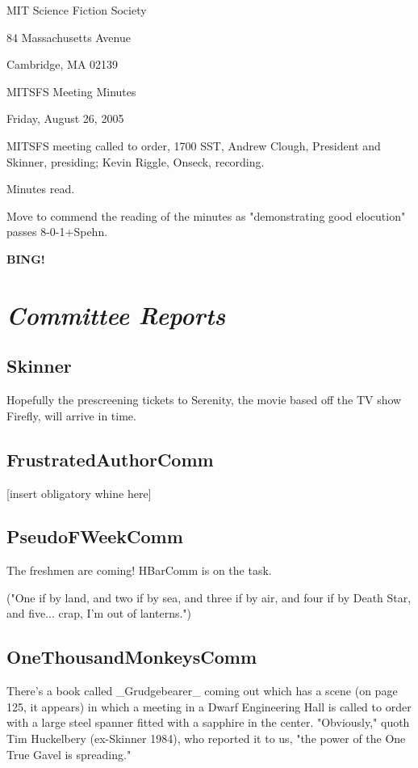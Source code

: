 \documentclass[10pt]{article}
\newcommand{\bing}{{\bf BING!} }
\newcommand{\goto}[1]{\bing \vskip 12pt \section*{{\em{#1}}}}
\begin{document}
\begin{center}

MIT Science Fiction Society

84 Massachusetts Avenue

Cambridge, MA 02139

\vspace{12pt}

MITSFS Meeting Minutes

Friday, August 26, 2005

\end{center}

\vspace{18pt}

\setlength{\parskip}{6pt}

\noindent
MITSFS meeting called to order, 1700 SST, Andrew Clough, President and 
Skinner, presiding; Kevin Riggle,  Onseck, recording.

Minutes read.

Move to commend the reading of the minutes as "demonstrating good elocution" passes 8-0-1+Spehn.

\goto{Committee Reports}
\subsection*{Skinner}
Hopefully the prescreening tickets to Serenity, the movie based off the TV show Firefly, will
arrive in time.

\subsection*{FrustratedAuthorComm}
[insert obligatory whine here]

\subsection*{PseudoFWeekComm}
The freshmen are coming!  HBarComm is on the task. 

("One if by land, and two if by sea, and
three if by air, and four if by Death Star, and five...  crap, I'm out of lanterns.")

\subsection*{OneThousandMonkeysComm}
There's a book called _Grudgebearer_ coming out which has a scene (on page 125, it appears)
in which a meeting in a Dwarf Engineering Hall is called to order with a large steel spanner
fitted with a sapphire in the center.  "Obviously," quoth Tim Huckelbery (ex-Skinner 1984), who
reported it to us, "the power of the One True Gavel is spreading."
\end{document}
